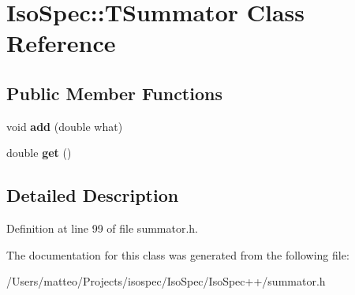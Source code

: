 \hypertarget{class_iso_spec_1_1_t_summator}{}\section{Iso\+Spec\+:\+:T\+Summator Class Reference}
\label{class_iso_spec_1_1_t_summator}
\subsection*{Public Member Functions}
\begin{DoxyCompactItemize}
\item 
\mbox{\label{class_iso_spec_1_1_t_summator_a5645d3fdac4e35f023fe7a08646dc413}} 
void {\bfseries add} (double what)
\item 
\mbox{\label{class_iso_spec_1_1_t_summator_a0db3add5376aae480fcaa3f489898bd7}} 
double {\bfseries get} ()
\end{DoxyCompactItemize}


\subsection{Detailed Description}


Definition at line 99 of file summator.\+h.



The documentation for this class was generated from the following file\+:\begin{DoxyCompactItemize}
\item 
/\+Users/matteo/\+Projects/isospec/\+Iso\+Spec/\+Iso\+Spec++/summator.\+h\end{DoxyCompactItemize}
